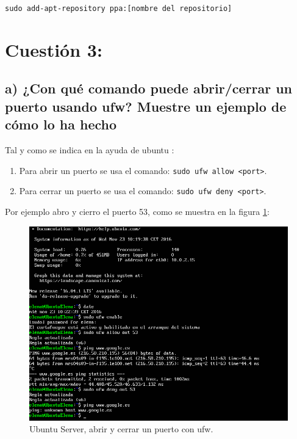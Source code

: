 \texttt{sudo add-apt-repository ppa:[nombre del repositorio]}



\section{Cuestión 3:}

\subsection{a) ¿Con qué comando puede abrir/cerrar un puerto usando ufw? Muestre un ejemplo de cómo lo ha hecho }
Tal y como se indica en la ayuda de ubuntu \cite{ufw}:
\begin{enumerate}
	\item Para abrir un puerto se usa el comando: \texttt{sudo ufw allow <port>}.
	\item Para cerrar un puerto se usa el comando: \texttt{sudo ufw deny <port>}. 
\end{enumerate}

Por ejemplo abro y cierro el puerto 53, como se muestra en la figura \ref{fig:ejercicio3a}:
\begin{figure}[H] 
	\centering
	\includegraphics[width=15cm]{./img/ejercicio3a.png} 	
	\caption{Ubuntu Server, abrir y cerrar un puerto con ufw.} \label{fig:ejercicio3a}
\end{figure}

